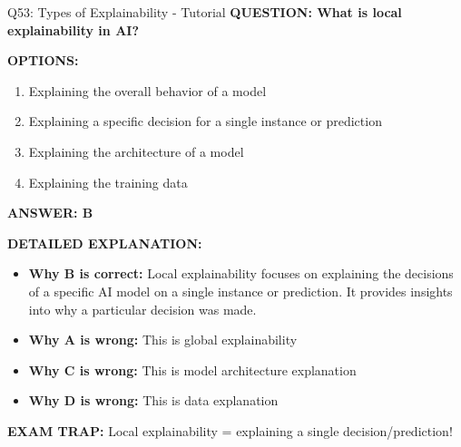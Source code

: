 \documentclass[8pt]{beamer}
\begin{document}
	\begin{frame}{Q53: Types of Explainability - Tutorial}
		\fontsize{6.5}{7.5}\selectfont
		\textbf{QUESTION: What is local explainability in AI?}
		
		\vspace{0.1cm}
		\textbf{OPTIONS:}
		\begin{enumerate}
			\item Explaining the overall behavior of a model
			\item Explaining a specific decision for a single instance or prediction
			\item Explaining the architecture of a model
			\item Explaining the training data
		\end{enumerate}
		
		\vspace{0.1cm}
		\textcolor{myblue}{\textbf{ANSWER: B}}
		
		\vspace{0.1cm}
		\textbf{DETAILED EXPLANATION:}
		\begin{itemize}
			\item \textbf{Why B is correct:} Local explainability focuses on explaining the decisions of a specific AI model on a single instance or prediction. It provides insights into why a particular decision was made.
			\item \textbf{Why A is wrong:} This is global explainability
			\item \textbf{Why C is wrong:} This is model architecture explanation
			\item \textbf{Why D is wrong:} This is data explanation
		\end{itemize}
		
		\textcolor{myred}{\textbf{EXAM TRAP:}} Local explainability = \textcolor{myblue}{explaining a single decision/prediction}!
	\end{frame}
	
\end{document}
